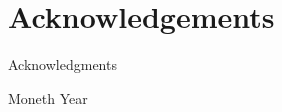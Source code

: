 
\bigskip


\begingroup

\let\clearpage\relax
\let\cleardoublepage\relax
\let\cleardoublepage\relax

\chapter*{Acknowledgements} %

\medskip

Acknowledgments 

\smiley{}

\medskip 
\noindent Moneth Year

\medskip 
\noindent\myName

\endgroup